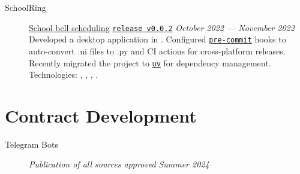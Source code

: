 \documentclass[margin,line]{resume}
\begin{document}
\begin{resume}
\begin{description}
    \item[SchoolRing]\small{\href{https://github.com/alchemmist/school-ring}{School
        bell scheduling} \begingroup
        \hypersetup{urlcolor=blue!30}
        \href{https://github.com/}{\texttt{release v0.0.2}}
        \endgroup
        \hfill
      \textsl{October 2022 — November 2022}\vspace{1mm}}\\
      Developed a desktop application in .
      Configured \href{https://github.com}{\texttt{pre-commit}} hooks
      to auto-convert .ui files to .py and CI actions for
      cross-platform releases. Recently migrated the project to
      \href{https://astral.sh/blog/uv}{\texttt{uv}} for dependency
      management. Technologies: ,
      , , .

  \end{description}

  \section{\mysidestyle Contract Development}\vspace{2mm}

  \begin{description}
    \item[Telegram Bots]\small{
        \begingroup
        \textcolor{gray!40}{\textit{Publication of all sources approved}}
        \endgroup
      }{\hfill
      \textsl{Summer 2024}}\vspace{2mm}
\end{description}
\end{resume}
\end{document}
